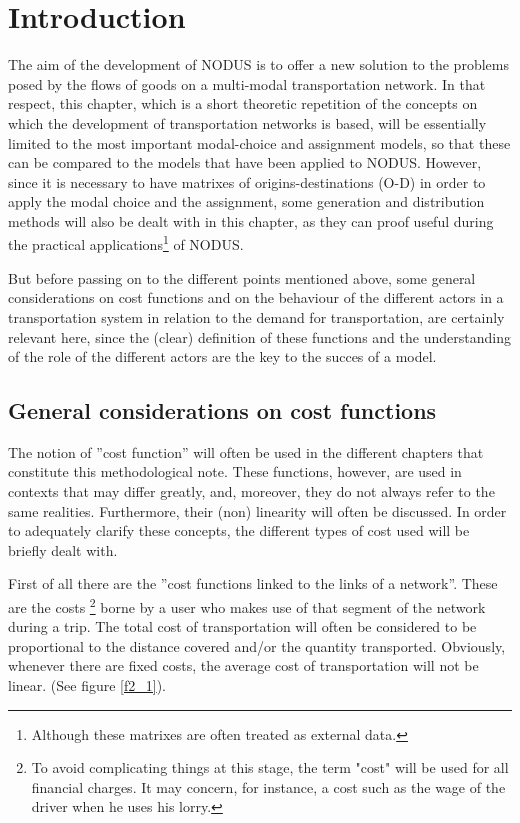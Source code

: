 
\section{Introduction}

The aim of the development of NODUS is to offer a new solution to the problems
posed by the flows of goods on a multi-modal transportation network.  In that
respect, this chapter, which is a short theoretic repetition of the concepts on
which the development of transportation networks is based, will be essentially
limited to the most important modal-choice and assignment models, so that these
can be compared to the models that have been applied to NODUS.  However, since
it is necessary to have matrixes of origins-destinations (O-D) in order to apply
the modal choice and the assignment, some generation and distribution methods
will also be dealt with in this chapter, as they can proof useful during the
practical applications\footnote{Although these matrixes are often treated as
external data.} of NODUS.


But before passing on to the different points mentioned above, some general
considerations on cost functions and on the behaviour of the different actors in
a transportation system in relation to the demand for transportation, are
certainly relevant here, since the (clear) definition of these functions and the
understanding of the role of the different actors are the key to the succes of a
model.



\subsection{General considerations on cost functions}

The notion of ''cost function'' will often be used in the different chapters
that constitute this methodological note.  These functions, however, are used in
contexts that may differ greatly, and, moreover, they do not always refer to the
same realities.  Furthermore, their (non) linearity will often be discussed.  In
order to adequately clarify these concepts, the different types of cost used
will be briefly dealt with.

First of all there are the ''cost functions linked to the links of a network''.
These are the costs \footnote{To avoid complicating things at this stage, the
term "cost" will be used for all financial charges.  It may concern, for
instance, a cost such as the wage of the driver when he uses his lorry.} borne
by a user who makes use of that segment of the network during a trip. The total
cost of transportation will often be considered to be proportional to the
distance covered and/or the quantity transported. Obviously, whenever there are
fixed costs, the average cost of transportation will not be linear. (See figure
\ref{f2_1}).

